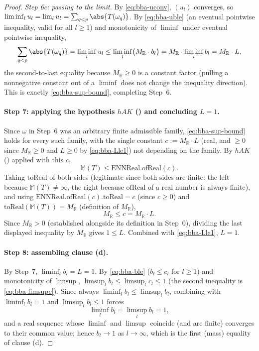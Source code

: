 \begin{proof}
  \emph{Step 6c: passing to the limit.} By \eqref{eq:bba-uconv}, $(u_l)$ converges, so
  $\liminf_l u_l = \lim_l u_l = \sum_{q<p}\abs{T(\omega_q)}$. By \eqref{eq:bba-uble} (an eventual
  pointwise inequality, valid for all $l\ge1$) and monotonicity of $\liminf$ under eventual
  pointwise inequality,
  \[
    \sum_{q<p}\abs{T(\omega_q)} = \liminf_l u_l \le \liminf_l \bigl(M_{\mathbb R}\cdot b_l\bigr)
    = M_{\mathbb R}\cdot\liminf_l b_l = M_{\mathbb R}\cdot L
    ,
  \]
  the second-to-last equality because $M_{\mathbb R}\ge0$ is a constant factor (pulling a
  nonnegative constant out of a $\liminf$ does not change the inequality direction). This is
  exactly \eqref{eq:bba-sup-bound}, completing Step~6.

  \paragraph{Step 7: applying the hypothesis $hAK$ () and concluding
  $L=1$.} Since $\omega$ in
  Step~6 was an arbitrary finite admissible family, \eqref{eq:bba-sup-bound} holds for every such
  family, with the single constant $c:=M_{\mathbb R}\cdot L$ (real, and $\ge0$ since
  $M_{\mathbb R}\ge0$ and $L\ge0$ by \eqref{eq:bba-Lle1}) not depending on the family. By
  $hAK$ () applied with this $c$,
  \[
    \mathbb M(T) \le \mathrm{ENNReal.ofReal}(c)
    .
  \]
  Taking $\mathrm{toReal}$ of both sides (legitimate since both sides are finite: the left because
  $\mathbb M(T)\ne\infty$, the right because $\mathrm{ofReal}$ of a real number is always finite),
  and using $\mathrm{ENNReal.ofReal}(c).\mathrm{toReal}=c$ (since $c\ge0$) and
  $\mathrm{toReal}(\mathbb M(T)) = M_{\mathbb R}$ (definition of $M_{\mathbb R}$),
  \[
    M_{\mathbb R} \le c = M_{\mathbb R}\cdot L
    .
  \]
  Since $M_{\mathbb R}>0$ (established alongside its definition in Step~0), dividing the last
  displayed inequality by $M_{\mathbb R}$ gives $1\le L$. Combined with \eqref{eq:bba-Lle1}, $L=1$.

  \paragraph{Step 8: assembling clause (d).} By Step~7, $\liminf_l b_l = L = 1$. By
  \eqref{eq:bba-ble} ($b_l\le c_l$ for $l\ge1$) and monotonicity of $\limsup$,
  $\limsup_l b_l \le \limsup_l c_l \le 1$ (the second inequality is \eqref{eq:bba-limsupc}). Since
  always $\liminf_l b_l\le\limsup_l b_l$, combining with $\liminf_l b_l=1$ and
  $\limsup_l b_l\le1$ forces
  \[
    \liminf_l b_l = \limsup_l b_l = 1
    ,
  \]
  and a real sequence whose $\liminf$ and $\limsup$ coincide (and are finite) converges to their
  common value; hence $b_l\to1$ as $l\to\infty$, which is the first (mass) equality of clause (d).


\end{proof}
